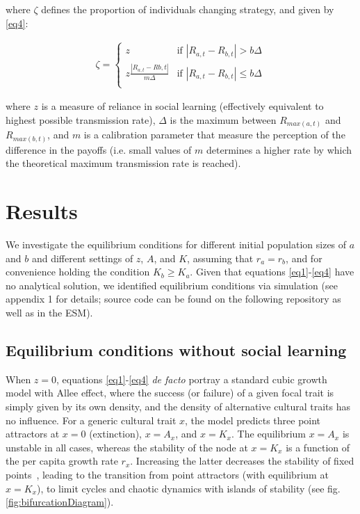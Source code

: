 \documentclass[3p,authoryear,twocolumn]{elsarticle} %
\begin{document}
where $\zeta$ defines the proportion of individuals changing strategy, and given by \eqref{eq4}:

\begin{align}
\label{eq4}
\zeta = 
\begin{cases}
z& \text{if }|R_{a,t}-R_{b,t}| > b\Delta\\
z\frac{|R_{a,t}-R{b,t}|}{m\Delta}& \text{if }|R_{a,t}-R_{b,t}| \leq b\Delta\\
\end{cases}
\end{align}

where $z$ is a measure of reliance in social learning (effectively equivalent to highest possible transmission rate), $\Delta$ is the maximum between $R_{max(a,t)}$ and $R_{max(b,t)}$, and $m$ is a calibration parameter that measure the perception of the difference in the payoffs (i.e. small values of $m$ determines a higher rate by which the theoretical maximum transmission rate is reached). 

\section{Results}

We investigate the equilibrium conditions for different initial population sizes of  $a$ and $b$ and different settings of $z$, $A$, and $K$, assuming that  $r_a=r_b$, and for convenience holding the condition $K_b \geq K_a$. Given that equations \ref{eq1}-\ref{eq4} have no analytical solution, we identified equilibrium conditions via simulation (see appendix 1 for details; source code can be found on the following repository %
as well as in the ESM).  

\subsection{Equilibrium conditions without social learning}

When $z=0$, equations \ref{eq1}-\ref{eq4} \emph{de facto} portray a standard cubic growth model with Allee effect, where the success (or failure) of a given focal trait is simply given by its own density, and the density of alternative cultural traits has no influence. For a generic cultural trait $x$, the model predicts three point attractors at $x=0$ (extinction), $x=A_x$, and $x=K_x$. The equilibrium $x=A_x$ is unstable in all cases, whereas the stability of the node at $x=K_x$ is a function of the per capita growth rate $r_x$. Increasing the latter decreases the stability of fixed points~\citep{scheuring_1999}, leading to the transition from point attractors (with equilibrium at $x=K_x$), to limit cycles and chaotic dynamics with islands of stability (see fig. \ref{fig:bifurcationDiagram}). %
\end{document}
